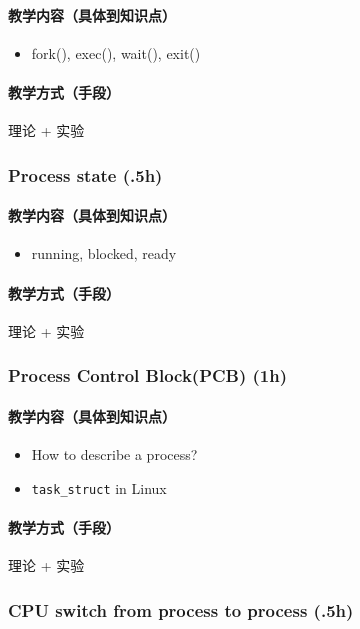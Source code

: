 \documentclass[11pt]{article}
\begin{document}
\paragraph{教学内容（具体到知识点）}
\label{sec-2-2-2-1}
\begin{itemize}
\item fork(), exec(), wait(), exit()
\end{itemize}
\paragraph{教学方式（手段）}
\label{sec-2-2-2-2}
理论 + 实验
\subsubsection{Process state (.5h)}
\label{sec-2-2-3}
\paragraph{教学内容（具体到知识点）}
\label{sec-2-2-3-1}
\begin{itemize}
\item running, blocked, ready
\end{itemize}
\paragraph{教学方式（手段）}
\label{sec-2-2-3-2}
理论 + 实验
\subsubsection{Process Control Block(PCB) (1h)}
\label{sec-2-2-4}
\paragraph{教学内容（具体到知识点）}
\label{sec-2-2-4-1}
\begin{itemize}
\item How to describe a process?
\item \texttt{task\_struct} in Linux
\end{itemize}
\paragraph{教学方式（手段）}
\label{sec-2-2-4-2}
理论 + 实验
\subsubsection{CPU switch from process to process (.5h)}
\label{sec-2-2-5}
\end{document}
